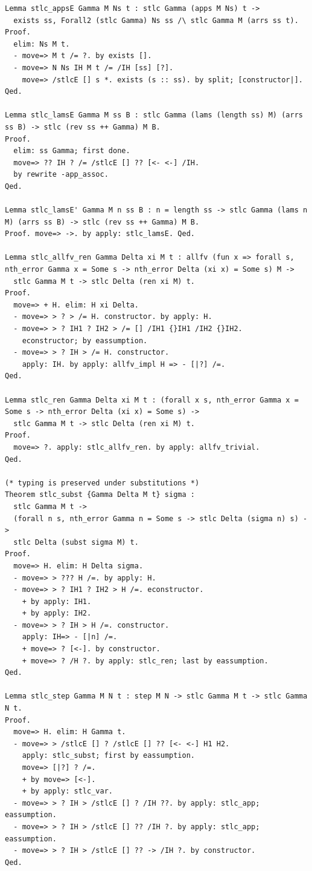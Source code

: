 \documentclass[10pt,a4paper]{amsart}
\begin{document}
\begin{lstlisting}
Lemma stlc_appsE Gamma M Ns t : stlc Gamma (apps M Ns) t ->
  exists ss, Forall2 (stlc Gamma) Ns ss /\ stlc Gamma M (arrs ss t).
Proof.
  elim: Ns M t.
  - move=> M t /= ?. by exists [].
  - move=> N Ns IH M t /= /IH [ss] [?].
    move=> /stlcE [] s *. exists (s :: ss). by split; [constructor|].
Qed.

Lemma stlc_lamsE Gamma M ss B : stlc Gamma (lams (length ss) M) (arrs ss B) -> stlc (rev ss ++ Gamma) M B.
Proof.
  elim: ss Gamma; first done.
  move=> ?? IH ? /= /stlcE [] ?? [<- <-] /IH.
  by rewrite -app_assoc.
Qed.

Lemma stlc_lamsE' Gamma M n ss B : n = length ss -> stlc Gamma (lams n M) (arrs ss B) -> stlc (rev ss ++ Gamma) M B.
Proof. move=> ->. by apply: stlc_lamsE. Qed.

Lemma stlc_allfv_ren Gamma Delta xi M t : allfv (fun x => forall s, nth_error Gamma x = Some s -> nth_error Delta (xi x) = Some s) M ->
  stlc Gamma M t -> stlc Delta (ren xi M) t.
Proof.
  move=> + H. elim: H xi Delta.
  - move=> > ? > /= H. constructor. by apply: H.
  - move=> > ? IH1 ? IH2 > /= [] /IH1 {}IH1 /IH2 {}IH2.
    econstructor; by eassumption.
  - move=> > ? IH > /= H. constructor.
    apply: IH. by apply: allfv_impl H => - [|?] /=.
Qed.

Lemma stlc_ren Gamma Delta xi M t : (forall x s, nth_error Gamma x = Some s -> nth_error Delta (xi x) = Some s) ->
  stlc Gamma M t -> stlc Delta (ren xi M) t.
Proof.
  move=> ?. apply: stlc_allfv_ren. by apply: allfv_trivial.
Qed.

(* typing is preserved under substitutions *)
Theorem stlc_subst {Gamma Delta M t} sigma :
  stlc Gamma M t ->
  (forall n s, nth_error Gamma n = Some s -> stlc Delta (sigma n) s) ->
  stlc Delta (subst sigma M) t.
Proof.
  move=> H. elim: H Delta sigma.
  - move=> > ??? H /=. by apply: H.
  - move=> > ? IH1 ? IH2 > H /=. econstructor.
    + by apply: IH1.
    + by apply: IH2.
  - move=> > ? IH > H /=. constructor.
    apply: IH=> - [|n] /=.
    + move=> ? [<-]. by constructor.
    + move=> ? /H ?. by apply: stlc_ren; last by eassumption.
Qed.

Lemma stlc_step Gamma M N t : step M N -> stlc Gamma M t -> stlc Gamma N t.
Proof.
  move=> H. elim: H Gamma t.
  - move=> > /stlcE [] ? /stlcE [] ?? [<- <-] H1 H2.
    apply: stlc_subst; first by eassumption.
    move=> [|?] ? /=.
    + by move=> [<-].
    + by apply: stlc_var.
  - move=> > ? IH > /stlcE [] ? /IH ??. by apply: stlc_app; eassumption.
  - move=> > ? IH > /stlcE [] ?? /IH ?. by apply: stlc_app; eassumption.
  - move=> > ? IH > /stlcE [] ?? -> /IH ?. by constructor.
Qed.


\end{lstlisting}
\end{document}
